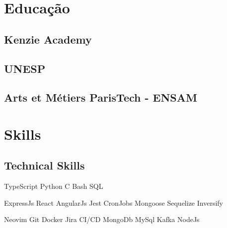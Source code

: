 \documentclass[]{deedy-resume-openfont}
\begin{document}
\begin{minipage}[t]{0.33\textwidth} 


\section{Educação} 

\subsection{Kenzie Academy}
\sectionsep

\subsection{UNESP}
\sectionsep

\subsection{Arts et Métiers ParisTech - ENSAM}
\sectionsep


\section{Skills}
\subsection{Technical Skills}

TypeScript \textbullet{} Python \textbullet{} C \textbullet{} Bash \textbullet{} SQL

\vspace{\topsep}
ExpressJs \textbullet{} React \textbullet{} AngularJs \textbullet{} Jest \textbullet{} CronJobs \textbullet{} Mongoose \textbullet{} Sequelize \textbullet{} Inversify

\vspace{\topsep}
Neovim \textbullet{} Git \textbullet{} Docker \textbullet{}  Jira \textbullet{}
CI/CD \textbullet{} MongoDb \textbullet{} MySql \textbullet{} Kafka \textbullet{} NodeJs


\end{minipage}
\end{document}

